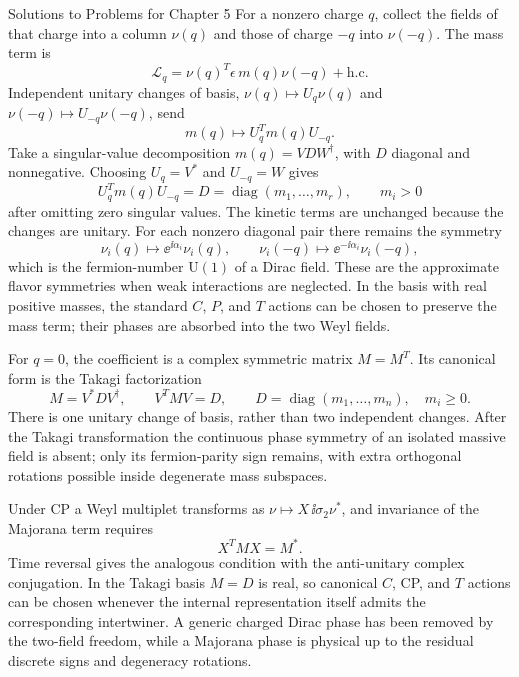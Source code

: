 \begin{bankssolutions}{Solutions to Problems for Chapter 5}
For a nonzero charge $q$, collect the fields of that charge into a column
$\nu(q)$ and those of charge $-q$ into $\nu(-q)$. The mass term is
\begin{equation*}
 \mathcal L_q=\nu(q)^T\epsilon\,m(q)\nu(-q)+\mathrm{h.c.}
\end{equation*}
Independent unitary changes of basis,
$\nu(q)\mapsto U_q\nu(q)$ and
$\nu(-q)\mapsto U_{-q}\nu(-q)$, send
\begin{equation*}
 m(q)\longmapsto U_q^T m(q)U_{-q}.
\end{equation*}
Take a singular-value decomposition $m(q)=V D W^\dagger$, with $D$ diagonal
and nonnegative. Choosing $U_q=V^*$ and $U_{-q}=W$ gives
\begin{equation*}
 U_q^Tm(q)U_{-q}=D=\operatorname{diag}(m_1,\ldots,m_r),
 \qquad m_i>0
\end{equation*}
after omitting zero singular values. The kinetic terms are unchanged because the
changes are unitary. For each nonzero diagonal pair there remains the symmetry
\begin{equation*}
 \nu_i(q)\mapsto\ee^{\ii\alpha_i}\nu_i(q),
 \qquad
 \nu_i(-q)\mapsto\ee^{-\ii\alpha_i}\nu_i(-q),
\end{equation*}
which is the fermion-number $\mathrm U(1)$ of a Dirac field. These are the
approximate flavor symmetries when weak interactions are neglected. In the basis
with real positive masses, the standard $C$, $P$, and $T$ actions can be chosen to
preserve the mass term; their phases are absorbed into the two Weyl fields.

For $q=0$, the coefficient is a complex symmetric matrix $M=M^T$. Its canonical
form is the Takagi factorization
\begin{equation*}
 M=V^*D V^\dagger,
 \qquad V^T M V=D,
 \qquad D=\operatorname{diag}(m_1,\ldots,m_n),\quad m_i\geq0.
\end{equation*}
There is one unitary change of basis, rather than two independent changes. After
the Takagi transformation the continuous phase symmetry of an isolated massive
field is absent; only its fermion-parity sign remains, with extra orthogonal
rotations possible inside degenerate mass subspaces.

Under CP a Weyl multiplet transforms as
$\nu\mapsto X\,\ii\sigma_2\nu^*$, and invariance of the Majorana term requires
\begin{equation*}
 X^T M X=M^*.
\end{equation*}
Time reversal gives the analogous condition with the anti-unitary complex
conjugation. In the Takagi basis $M=D$ is real, so canonical $C$, CP, and $T$
actions can be chosen whenever the internal representation itself admits the
corresponding intertwiner. A generic charged Dirac phase has been removed by the
two-field freedom, while a Majorana phase is physical up to the residual discrete
signs and degeneracy rotations.


\end{bankssolutions}
